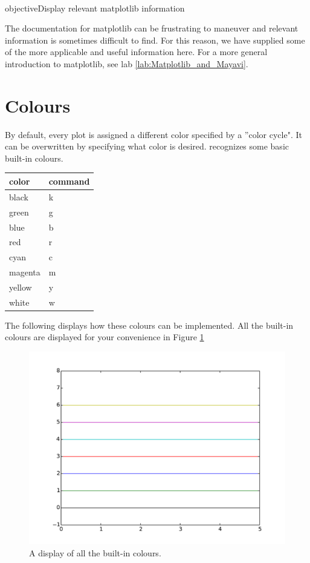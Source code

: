 \label{mpltables}

\\objective{Display relevant matplotlib information}

The documentation for matplotlib can be frustrating to maneuver and relevant information is sometimes difficult to find. 
For this reason, we have supplied some of the more applicable and useful information here. 
For a more general introduction to matplotlib, see lab \ref{lab:Matplotlib_and_Mayavi}.


\section*{Colours}
By default, every plot is assigned a different color specified by a ''color cycle". 
It can be overwritten by specifying what color is desired.  recognizes some basic built-in colours. 

\begin{tabular}
{|l||l|}
\hline
color & command \\
\hline
black & k \\
green & g \\
blue & b \\
red & r \\
cyan & c \\
magenta & m \\
yellow & y \\
white & w\\
\hline

\end{tabular}


The following displays how these colours can be  implemented. 
All the built-in colours are displayed for your convenience in Figure \ref{colours}


\begin{figure} 
\includegraphics[width=\textwidth]{colours.pdf}
\caption{A display of all the built-in colours.}
\label{colours} 
\end{figure}


